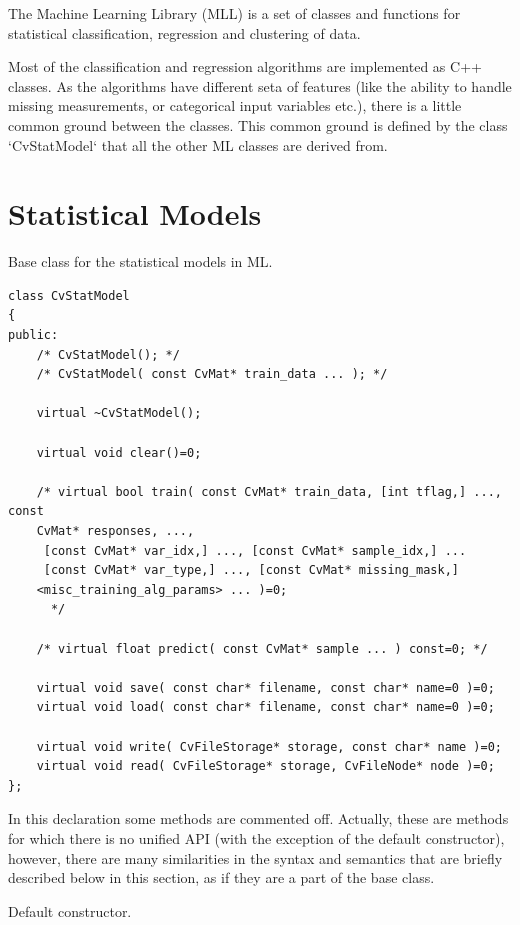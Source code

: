 The Machine Learning Library (MLL) is a set of classes and functions for statistical classification, regression and clustering of data.

Most of the classification and regression algorithms are implemented as C++ classes. As the algorithms have different seta of features (like the ability to handle missing measurements, or categorical input variables etc.), there is a little common ground between the classes. This common ground is defined by the class `CvStatModel` that all the other ML classes are derived from.

\ifCpp

\section{Statistical Models}

Base class for the statistical models in ML.

\begin{lstlisting}
class CvStatModel
{
public:
    /* CvStatModel(); */
    /* CvStatModel( const CvMat* train_data ... ); */

    virtual ~CvStatModel();

    virtual void clear()=0;

    /* virtual bool train( const CvMat* train_data, [int tflag,] ..., const 
	CvMat* responses, ...,
     [const CvMat* var_idx,] ..., [const CvMat* sample_idx,] ...
     [const CvMat* var_type,] ..., [const CvMat* missing_mask,] 
	<misc_training_alg_params> ... )=0;
      */

    /* virtual float predict( const CvMat* sample ... ) const=0; */

    virtual void save( const char* filename, const char* name=0 )=0;
    virtual void load( const char* filename, const char* name=0 )=0;

    virtual void write( CvFileStorage* storage, const char* name )=0;
    virtual void read( CvFileStorage* storage, CvFileNode* node )=0;
};
\end{lstlisting}

In this declaration some methods are commented off. Actually, these are methods for which there is no unified API (with the exception of the default constructor), however, there are many similarities in the syntax and semantics that are briefly described below in this section, as if they are a part of the base class.


Default constructor.


